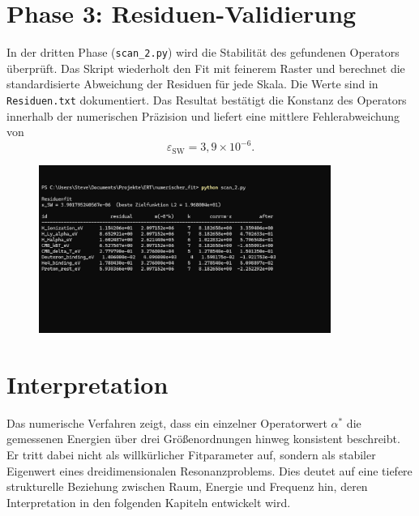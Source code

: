 \newpage
\section{Phase 3: Residuen-Validierung}

In der dritten Phase (\texttt{scan\_2.py}) wird die Stabilität des gefundenen
Operators überprüft. Das Skript wiederholt den Fit mit feinerem Raster und
berechnet die standardisierte Abweichung der Residuen für jede Skala.
Die Werte sind in \texttt{Residuen.txt} dokumentiert.
Das Resultat bestätigt die Konstanz des Operators innerhalb der numerischen
Präzision und liefert eine mittlere Fehlerabweichung von
\[
  \varepsilon_{\mathrm{SW}} = 3{,}9\times10^{-6}.
\]

\begin{figure}
  \centering
  \includegraphics[width=0.85\textwidth]{Grafiken/03_numerischer_scan_fit/scan2.jpg}
  \label{fig:scan2}
\end{figure}

\section{Interpretation}

Das numerische Verfahren zeigt, dass ein einzelner Operatorwert
$\alpha^*$ die gemessenen Energien über drei Größenordnungen hinweg
konsistent beschreibt.  
Er tritt dabei nicht als willkürlicher Fitparameter auf, sondern als stabiler
Eigenwert eines dreidimensionalen Resonanzproblems.
Dies deutet auf eine tiefere strukturelle Beziehung zwischen
Raum, Energie und Frequenz hin, deren Interpretation
in den folgenden Kapiteln entwickelt wird.
